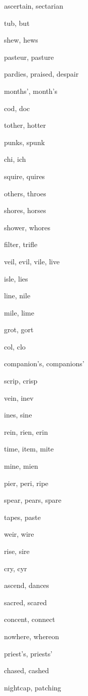     \item ascertain, sectarian
    \item tub, but
    \item shew, hews
    \item pasteur, pasture
    \item pardies, praised, despair
    \item months', month's
    \item cod, doc
    \item tother, hotter
    \item punks, spunk
    \item chi, ich
    \item squire, quires
    \item others, throes
    \item shores, horses
    \item shower, whores
    \item filter, trifle
    \item veil, evil, vile, live
    \item isle, lies
    \item line, nile
    \item mile, lime
    \item grot, gort
    \item col, clo
    \item companion's, companions'
    \item scrip, crisp
    \item vein, inev
    \item ines, sine
    \item rein, rien, erin
    \item time, item, mite
    \item mine, mien
    \item pier, peri, ripe
    \item spear, pears, spare
    \item tapes, paste
    \item weir, wire
    \item rise, sire
    \item cry, cyr
    \item ascend, dances
    \item sacred, scared
    \item concent, connect
    \item nowhere, whereon
    \item priest's, priests'
    \item chased, cashed
    \item nightcap, patching
